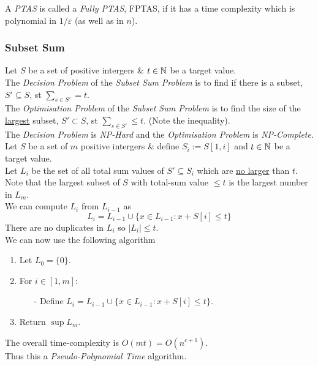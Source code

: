 \documentclass[11pt,a4paper]{article}
\begin{document}
A \textit{PTAS} is called a \textit{Fully PTAS}, FPTAS, if it has a time complexity which is polynomial in $1/\varepsilon$ (as well as in $n$).

\subsubsection{Subset Sum}

Let $S$ be a set of positive intergers \& $t\in\mathbb{N}$ be a target value.\\
The \textit{Decision Problem} of the \textit{Subset Sum Problem} is to find if there is a subset, $S'\subseteq S$, st $\sum_{s\in S'}=t$.\\
The \textit{Optimisation Problem} of the \textit{Subset Sum Problem} is to find the size of the \underline{largest} subset, $S'\subset S$, st $\sum_{s\in S'}\leq t$. (Note the inequality).\\
\nb The \textit{Decision Problem} is \textit{NP-Hard} and the \textit{Optimisation Problem} is \textit{NP-Complete}.\\

Let $S$ be a set of $m$ positive intergers \& define $S_i:=S[1,i]$ and $t\in\mathbb{N}$ be a target value.\\
Let $L_i$ be the set of all total sum values of $S'\subseteq S_i$ which are \underline{no larger} than $t$.\\
Note that the largest subset of $S$ with total-sum value $\leq t$ is the largest number in $L_m$.\\
We can compute $L_i$ from $L_{i-1}$ as
$$L_i=L_{i-1}\cup\{x\in L_{i-1}:x+S[i]\leq t\}$$
There are no duplicates in $L_i$ so $|L_i|\leq t$.\\
We can now use the following algorithm
\begin{enumerate}
	\item Let $L_0=\{0\}$.
	\item For $i\in[1,m]$:
	\begin{itemize}
		\item[-] Define $L_i=L_{i-1}\cup\{x\in L_{i-1}:x+S[i]\leq t\}$.
	\end{itemize}
	\item Return $\sup L_m$.
\end{enumerate}
The overall time-complexity is $O(mt)=O(n^{c+1})$.\\
Thus this a \textit{Pseudo-Polynomial Time} algorithm.\\
\end{document}
